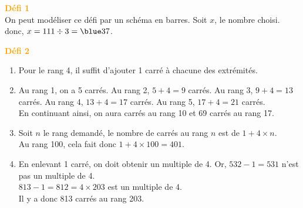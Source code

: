 \begin{corrige}
\hspace*{-7.5mm} \textcolor{orange}{\bf Défi 1} \\
   On peut modéliser ce défi par un schéma en barres. Soit $x$, le nombre choisi. \\
    donc, $x =111\div3 ={\blue 37}$.

\hspace*{-7.5mm} \textcolor{orange}{\bf Défi 2} \\
   \begin{enumerate}
      \item Pour le rang 4, il suffit {\blue d'ajouter 1 carré à chacune des extrémités}.
      \item Au rang 1, on a 5 carrés. Au rang 2, $5+4 =9$ carrés. Au rang 3, $9+4 =13$ carrés.  Au rang 4, $13+4 =17$ carrés. {\blue Au rang 5, $17+4 =21$ carrés}. \\
         En continuant ainsi, on aura { carrés au rang 10 et 69 carrés au rang 17}.
         \item Soit $n$ le rang demandé, {\blue le nombre de carrés au rang $n$ est de $1+4\times n$}. \\
            Au rang 100, cela fait donc $1+4\times100 =401$.
         \item En enlevant 1 carré, on doit obtenir un multiple de 4. Or, $532-1 =531$ n'est pas un multiple de 4. \\
            $813-1 =812 =4\times203$ est un multiple de 4. \\
            {\blue Il y a donc 813 carrés au rang 203}.     
   \end{enumerate}
\end{corrige}

